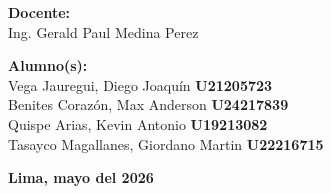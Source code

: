 \begin{titlepage}
    \begin{minipage}[t]{0.45\textwidth}
        \begin{flushleft} \normalsize
            \textbf{Docente:}\\
            Ing. Gerald Paul Medina Perez
        \end{flushleft}
    \end{minipage}
    \hfill
    \begin{minipage}[t]{0.5\textwidth}
        \begin{flushright} \normalsize
            \textbf{Alumno(s):}\\
            Vega Jauregui, Diego Joaquín \hfill \textbf{U21205723}\\
            Benites Corazón, Max Anderson \hfill \textbf{U24217839}\\
            Quispe Arias, Kevin Antonio \hfill \textbf{U19213082}\\
            Tasayco Magallanes, Giordano Martin \hfill \textbf{U22216715}
        \end{flushright}
    \end{minipage}

    \vfill

    {\large \textbf{Lima, mayo del 2026} \par}
\end{titlepage}
